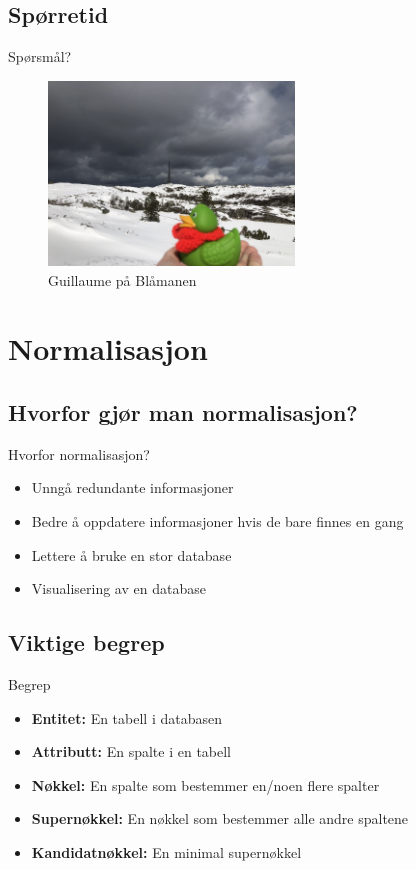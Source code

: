 \subsection*{Spørretid}
\begin{frame}{Spørsmål?}
    \begin{figure}
        \centering
        \includegraphics[height = 4.9cm]{images/guillaume6.jpg}
        \caption{Guillaume på Blåmanen}
        \label{fig:guillaume6}
    \end{figure}
\end{frame}


\section{Normalisasjon}
\subsection*{Hvorfor gjør man normalisasjon?}
\begin{frame}{Hvorfor normalisasjon?}
\begin{itemize}
    \item Unngå redundante informasjoner
    \item Bedre å oppdatere informasjoner hvis de bare finnes en gang
    \item Lettere å bruke en stor database
    \item Visualisering av en database
\end{itemize}
\end{frame}

\subsection*{Viktige begrep}
\begin{frame}{Begrep}
\begin{itemize}
    \item \textbf{Entitet: }En tabell i databasen
    \item \textbf{Attributt: }En spalte i en tabell
    \item \textbf{Nøkkel: }En spalte som bestemmer en/noen flere spalter
    \item \textbf{Supernøkkel: }En nøkkel som bestemmer alle andre spaltene
    \item \textbf{Kandidatnøkkel: }En minimal supernøkkel
\end{itemize}
\end{frame}

